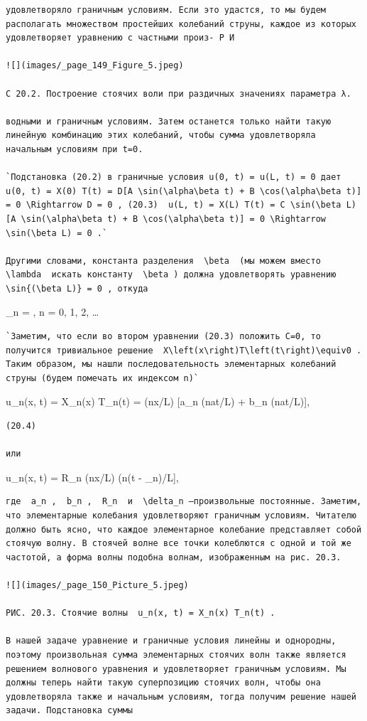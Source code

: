 \documentclass[
  ukrainian,
]{article}
\begin{document}
\begin{verbatim}
удовлетворяло граничным условиям. Если это удастся, то мы будем располагать множеством простейших колебаний струны, каждое из которых удовлетворяет уравнению с частными произ- Р И

![](images/_page_149_Figure_5.jpeg)

С 20.2. Построение стоячих воли при раздичных значениях параметра λ.

водными и граничным условиям. Затем останется только найти такую линейную комбинацию этих колебаний, чтобы сумма удовлетворяла начальным условиям при t=0.

`Подстановка (20.2) в граничные условия u(0, t) = u(L, t) = 0 дает  u(0, t) = X(0) T(t) = D[A \sin(\alpha\beta t) + B \cos(\alpha\beta t)] = 0 \Rightarrow D = 0 , (20.3)  u(L, t) = X(L) T(t) = C \sin(\beta L) [A \sin(\alpha\beta t) + B \cos(\alpha\beta t)] = 0 \Rightarrow \sin(\beta L) = 0 .`

Другими словами, константа разделения  \beta  (мы можем вместо  \lambda  искать константу  \beta ) должна удовлетворять уравнению  \sin{(\beta L)} = 0 , откуда
\end{verbatim}

\beta\_n = , \quad n = 0, 1, 2, \ldots

\begin{verbatim}
`Заметим, что если во втором уравнении (20.3) положить C=0, то получится тривиальное решение  X\left(x\right)T\left(t\right)\equiv0 . Таким образом, мы нашли последовательность элементарных колебаний струны (будем помечать их индексом n)`
\end{verbatim}

u\_n(x, t) = X\_n(x) T\_n(t) = \sin(n\pi x/L) {[}a\_n \sin(n\pi at/L) +
b\_n \cos(n\pi at/L){]},

\begin{verbatim}
(20.4)

или
\end{verbatim}

u\_n(x, t) = R\_n \sin(n\pi x/L) \cos(n\pi\alpha (t - \delta\_n)/L{]},

\begin{verbatim}
где  a_n ,  b_n ,  R_n  и  \delta_n —произвольные постоянные. Заметим, что элементарные колебания удовлетворяют граничным условиям. Читателю должно быть ясно, что каждое элементарное колебание представляет собой стоячую волну. В стоячей волне все точки колеблются с одной и той же частотой, а форма волны подобна волнам, изображенным на рис. 20.3.

![](images/_page_150_Picture_5.jpeg)

РИС. 20.3. Стоячие волны  u_n(x, t) = X_n(x) T_n(t) .

В нашей задаче уравнение и граничные условия линейны и однородны, поэтому произвольная сумма элементарных стоячих волн также является решением волнового уравнения и удовлетворяет граничным условиям. Мы должны теперь найти такую суперпозицию стоячих волн, чтобы она удовлетворяла также и начальным условиям, тогда получим решение нашей задачи. Подстановка суммы
\end{verbatim}
\end{document}
